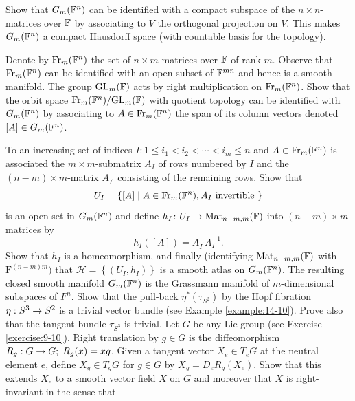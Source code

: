 \begin{enumerate}[label=\theexercise.\arabic*.,ref=\theexercise.\arabic*,leftmargin=2.7em]
    Show that ${G}_{m}( {\mathbb{F}}^{n})$ can be identified with a compact subspace of the $n \times  n$-matrices over $\mathbb{F}$ by associating to $V$ the orthogonal projection on $V$. This makes ${G}_{m}( {\mathbb{F}}^{n})$ a compact Hausdorff space (with countable basis for the topology).\par
    Denote by ${\mathrm{Fr}}_{m}( {\mathbb{F}}^{n})$ the set of $n \times  m$ matrices over $\mathbb{F}$ of rank $m$. Observe that ${\mathrm{Fr}}_{m}( {\mathbb{F}}^{n})$ can be identified with an open subset of ${\mathbb{F}}^{mn}$ and hence is a smooth manifold. The group ${\mathrm{{GL}}}_{m}(\mathbb{F})$ acts by right multiplication on ${\mathrm{Fr}}_{m}( {\mathbb{F}}^{n})$. Show that the orbit space ${\mathrm{Fr}}_{m}( {\mathbb{F}}^{n}) /{\mathrm{{GL}}}_{m}( \mathbb{F})$ with quotient topology can be identified with ${G}_{m}( {\mathbb{F}}^{n})$ by associating to $A \in  {\ensuremath{\mathrm{Fr}}}_{m}( {\mathbb{F}}^{n})$ the span of its column vectors denoted $[ A]  \in  {G}_{m}( {\mathbb{F}}^{n})$. \par
    To an increasing set of indices $I\colon 1 \leq  {i}_{1} < {i}_{2} < \cdots  < {i}_{m} \leq  n$ and $A \in  {\ensuremath{\mathrm{Fr}}}_{m}( {\mathbb{F}}^{n})$ is associated the $m \times m$-submatrix ${A}_{I}$ of rows numbered by $I$ and the $( {n- m})  \times  m$-matrix ${A}_{{I}^{\prime }}$ consisting of the remaining rows. Show that
    \[
      {U}_{I} = \left\{  {[  A]   \mid  A \in  {\ensuremath{\mathrm{Fr}}}_{m}( {\mathbb{F}}^{n}),{A}_{I}\text{ invertible }}\right\}
    \]
    is an open set in ${G}_{m}( {\mathbb{F}}^{n})$ and define ${h}_{I}\colon {U}_{I} \rightarrow  {\ensuremath{\mathrm{Mat}}}_{n- m,m}( \mathbb{F})$ into $( {n- m})  \times  m$ matrices by
    \[
      {h}_{I}( [  A]  )  = {A}_{{I}^{\prime }}{A}_{I}^{-1}.
    \]
    Show that ${h}_{I}$ is a homeomorphism, and finally (identifying ${\mathrm{Mat}}_{n- m,m}( \mathbb{F})$ with ${\mathrm{F}}^{( {n- m}) m})$ that $\mathcal{H} = \left\{  ( {{U}_{I},{h}_{I}}) \right\}$ is a smooth atlas on ${G}_{m}( {\mathbb{F}}^{n})$. The resulting closed smooth manifold ${G}_{m}( {\mathbb{F}}^{n})$ is the Grassmann manifold of $m$-dimensional subspaces of ${F}^{n}$.
  \newchap[15]
  \NewItem Show that the pull-back ${\eta }^*( {\tau }_{{S}^{2}})$ by the Hopf fibration $\eta  : {S}^{3} \rightarrow  {S}^{2}$ is a trivial vector bundle (see Example \ref{example:14-10}). Prove also that the tangent bundle ${\tau }_{{S}^{3}}$ is trivial.
  \NewItem Let $G$ be any Lie group (see Exercise \ref{exercise:9-10}). Right translation by $g \in  G$ is the diffeomorphism ${R}_{g} : G \rightarrow  G;\;{R}_{g}( x)  = {xg}$. Given a tangent vector ${X}_{e} \in  {T}_{e}G$ at the neutral element $e$, define ${X}_{g} \in  {T}_{g}G$ for $g \in  G$ by ${X}_{g} = {D}_{e}{R}_{g}( {X}_{e})$. Show that this extends ${X}_{e}$ to a smooth vector field $X$ on $G$ and moreover that $X$ is right-invariant in the sense that

\end{enumerate}
